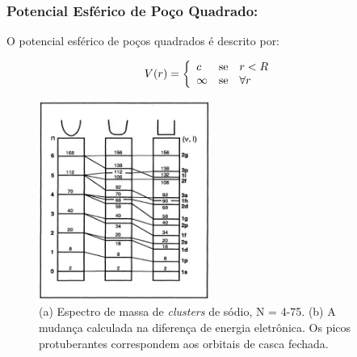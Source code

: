 \subsubsection{Potencial Esférico de Poço Quadrado:}

O potencial esférico de poços quadrados é descrito por:



\begin{equation}
 V(r) = \left\{\begin{array}{lll}
c & \hbox{se} & r < R \\
\infty & \hbox{se}  & \forall r
\end{array}\right.
\end{equation}











\begin{figure}
  \centering
  \includegraphics[width=0.5\textwidth]{images/clusters/pocos}
  \caption{(a) Espectro de massa de \textit{clusters} de sódio, N = 4-75.
  (b) A mudança calculada na diferença de energia eletrônica. Os picos protuberantes correspondem aos orbitais de casca fechada.\cite{electronic_Shell_sodium}  }
  \label{fig:pocos}
\end{figure}


